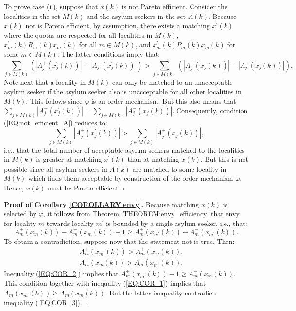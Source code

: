 \documentclass[12pt,fleqn]{article}
\begin{document}
To prove case (ii), suppose that $x(k)$ is not Pareto efficient. Consider the localities in the set $M(k)$ and the asylum seekers in the set $A(k)$. Because $x(k)$ not is Pareto efficient, by assumption, there exists a matching $x^\prime(k)$ where the quotas are respected for all localities in $M(k)$, $x_m^\prime(k)R_m(k) x_m(k)$ for all $m\in M(k)$, and $x_m^\prime(k)P_m(k) x_m(k)$ for some $m\in M(k)$. The latter conditions imply that:
\begin{equation}
\sum_{j\in M(k)}\left(|A_j^+(x_j^\prime(k))|-|A_j^-(x_j^\prime(k))|\right)>\sum_{j\in M(k)}\left(|A_j^+({x_j}(k))|-|A_j^-({x_j}(k))|\right).\label{EQ:not_efficient_A}
\end{equation}
\noindent Note next that a locality in $M(k)$ can only be matched to an unacceptable asylum seeker if the asylum seeker also is unacceptable for all other localities in $M(k)$. This follows since $\varphi$ is an order mechanism. But this also means that $\sum_{j\in M(k)}|A_j^-(x_j^\prime(k))|=\sum_{j\in M(k)}|A_j^-({x_j}(k))|$. Consequently, condition (\ref{EQ:not_efficient_A}) reduces to:
\begin{equation}
\sum_{j\in M(k)}|A_j^+(x_j^\prime(k))|>\sum_{j\in M(k)}|A_j^+({x_j}(k))|,\label{EQ:not_efficient_B}
\end{equation}
\noindent i.e., that the total number of acceptable asylum seekers matched to the localities in $M(k)$ is greater at matching $x^\prime(k)$ than at matching $x(k)$. But this is not possible since all asylum seekers in $A(k)$ are matched to some locality in $M(k)$ which finds them acceptable by construction of the order mechanism $\varphi$. Hence, $x(k)$ must be Pareto efficient. \hfill $\square$

\medskip

\noindent\textbf{Proof of Corollary \ref{COROLLARY:envy}.} Because matching $x(k)$ is selected by $\varphi$, it follows from Theorem \ref{THEOREM:envy_efficiency} that envy for locality $m$ towards locality $m^\prime$ is bounded by a single asylum seeker, i.e., that:
\begin{equation}
A_m^+(x_m(k))-A_m^-(x_m(k))+1\geq A_m^+(x_{m^\prime}(k))-A_m^-(x_{m^\prime}(k)).\label{EQ:COR_1}
\end{equation}
\noindent To obtain a contradiction, suppose now that the statement not is true. Then:
\begin{eqnarray}
&& A_m^+(x_{m^\prime}(k))>A_m^+(x_m(k)),\label{EQ:COR_2} \\
&& A_m^-(x_m(k))>A_m^-(x_{m^\prime}(k)).\label{EQ:COR_3}
\end{eqnarray}
\noindent Inequality (\ref{EQ:COR_2}) implies that $A_m^+(x_{m^\prime}(k))-1\geq A_m^+(x_m(k))$. This condition together with inequality (\ref{EQ:COR_1}) implies that $A_m^-(x_{m^\prime}(k))\geq A_m^-(x_m(k))$. But the latter inequality contradicts inequality (\ref{EQ:COR_3}).~\hfill$\square$
\end{document}

